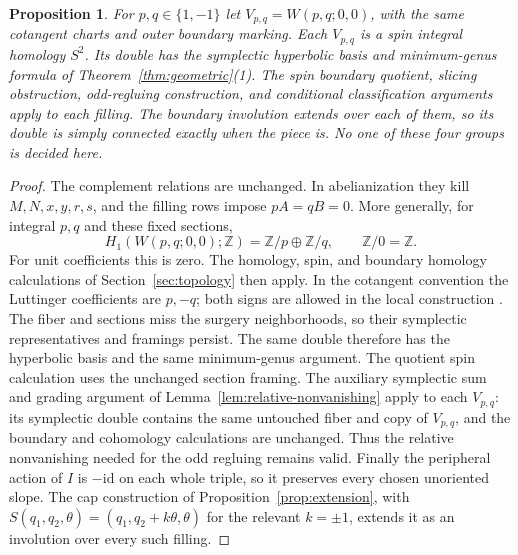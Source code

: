 \documentclass[11pt]{amsart}
\newtheorem{proposition}[theorem]{Proposition}
\theoremstyle{definition}
\theoremstyle{remark}
\newcommand{\Z}{\mathbb Z}
\begin{document}
\begin{proposition}\label{prop:variants}
For $p,q\in\{1,-1\}$ let $V_{p,q}=W(p,q;0,0)$, with the
same cotangent charts and outer boundary marking. Each $V_{p,q}$
is a spin integral homology $S^2$. Its double has the symplectic
hyperbolic basis and minimum-genus formula of
Theorem~\ref{thm:geometric}(1). The spin boundary quotient, slicing
obstruction, odd-regluing construction, and conditional classification
arguments apply to each filling. The boundary involution extends over
each of them, so its double is simply connected exactly when the piece
is. No one of these four groups is decided here.
\end{proposition}
\begin{proof}
The complement relations are unchanged. In abelianization they kill
$M,N,x,y,r,s$, and the filling rows impose $pA=qB=0$. More generally,
for integral $p,q$ and these fixed sections,
\[
 H_1(W(p,q;0,0);\Z)=\Z/p\oplus\Z/q,
 \qquad \Z/0=\Z.
\]
For unit coefficients this is zero. The homology, spin, and boundary
homology calculations of Section~\ref{sec:topology} then apply.
In the cotangent convention the Luttinger coefficients are $p,-q$;
both signs are allowed in the local construction \cite{ADK03}.
The fiber and sections miss the surgery neighborhoods, so their
symplectic representatives and framings persist. The same double
therefore has the hyperbolic basis and the same minimum-genus argument.
The quotient spin calculation uses the unchanged section framing.
The auxiliary symplectic sum and grading argument of
Lemma~\ref{lem:relative-nonvanishing} apply to each $V_{p,q}$:
its symplectic double contains the same untouched fiber and copy of
$V_{p,q}$, and the boundary and cohomology calculations are unchanged.
Thus the relative nonvanishing needed for the odd regluing remains
valid. Finally the
peripheral action of $I$ is $-\mathrm{id}$ on each whole triple,
so it preserves every chosen unoriented slope. The cap construction
of Proposition~\ref{prop:extension}, with
$S(q_1,q_2,\theta)=(q_1,q_2+k\theta,\theta)$ for the relevant
$k=\pm1$, extends it as an involution over every such filling.
\end{proof}
\end{document}
